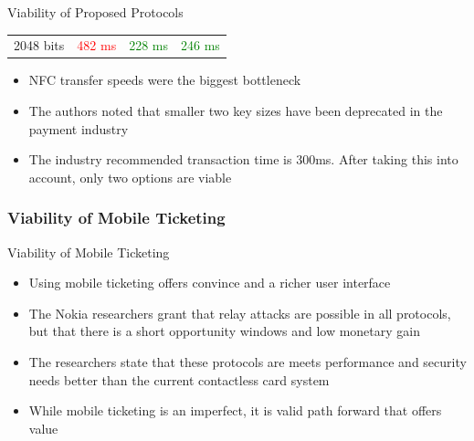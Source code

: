 \documentclass[unknownkeysallowed]{beamer}
\begin{document}
\begin{frame}
\begin{center}
\begin{minipage}{.9\textwidth}
\begin{block}{Viability of Proposed Protocols}
\begin{table}
{\begin{tabular}{c|c|c|c}
            2048 bits & \textcolor{red}{482 ms} & \textcolor{green}{228 ms} & \textcolor{green}{246 ms}\\
          \end{tabular}
        }
      \end{table}
      \begin{itemize}
        \item<2->{NFC transfer speeds were the biggest bottleneck}
        \item<3->{The authors noted that smaller two key sizes have been deprecated in the payment industry}
        \item<5->{The industry recommended transaction time is 300ms. After taking this into account, only two options are viable}
      \end{itemize}
    \end{block}
  \end{minipage}
  \end{center}
\end{frame}

\begin{frame}
\frametitle{Viability of Mobile Ticketing}
  \begin{center}
  \begin{minipage}{.9\textwidth}
    \begin{block}{Viability of Mobile Ticketing}
        \begin{itemize}
        \item{Using mobile ticketing offers convince and a richer user interface}
        \pause
        \vspace{1mm}
        \item{The Nokia researchers grant that relay attacks are possible in all protocols, but that there is a short opportunity windows and low monetary gain }
        \pause
        \vspace{1mm}
        \item{The researchers state that these protocols are meets performance and security needs better than the current contactless card system}
        \pause
        \vspace{1mm}
        \item{While mobile ticketing is an imperfect, it is valid path forward that offers value}
      \end{itemize}
    \end{block}
  \end{minipage}
  \end{center}
\end{frame}
\end{document}
